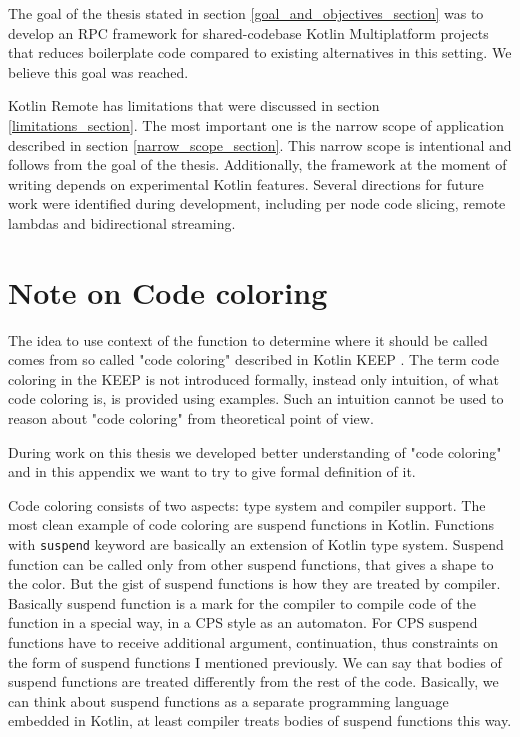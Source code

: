 \documentclass[a4paper,11pt,oneside]{article}
\newcommand{\kotlini}[1]{\texttt{#1}}
\newcommand{\ki}[1]{\kotlini{#1}}
\begin{document}
The goal of the thesis stated in section \ref{goal_and_objectives_section} was to develop an RPC
framework for shared-codebase Kotlin Multiplatform projects that reduces boilerplate code compared
to existing alternatives in this setting. We believe this goal was reached.

Kotlin Remote has limitations that were discussed in section \ref{limitations_section}. The most
important one is the narrow scope of application described in section \ref{narrow_scope_section}.
This narrow scope is intentional and follows from the goal of the thesis. Additionally, the
framework at the moment of writing depends on experimental Kotlin features. Several directions for
future work were identified during development, including per node code slicing, remote lambdas
and bidirectional streaming.

\newpage
%
%
\printbibliography

\clearpage
\appendix
\section{Note on Code coloring}
The idea to use context of the function to determine where it should be called comes from so called
"code coloring" described in Kotlin KEEP \cite{noauthor_keepnotescode-coloringmd_nodate}. The term
code coloring in the KEEP is not introduced formally, instead only intuition, of what code coloring
is, is provided using examples. Such an intuition cannot be used to reason about "code coloring" 
from theoretical point of view.

During work on this thesis we developed better understanding of "code coloring" and 
in this appendix we want to try to give formal definition of it.

Code coloring consists of two aspects: type system and compiler support. The most
clean example of code coloring are suspend functions in Kotlin. Functions with \ki{suspend} keyword 
are basically an extension of Kotlin type system. Suspend function can be called only from other
suspend functions, that gives a shape to the color. But the gist of suspend functions is
how they are treated by compiler. Basically suspend function is a mark for the compiler 
to compile code of the function in a special way, in a CPS style as an automaton. For CPS suspend functions have 
to receive additional argument, continuation, thus constraints on the form of suspend functions I 
mentioned previously. We can say that bodies of suspend functions are treated differently from the rest 
of the code. Basically, we can think about suspend functions as a separate programming language embedded in
Kotlin, at least compiler treats bodies of suspend functions this way. 
\end{document}
